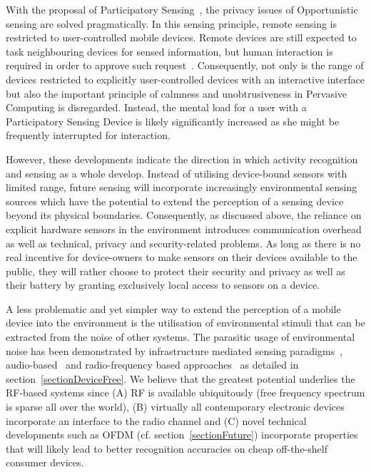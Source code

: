 \documentclass[journal]{IEEEtran}
\begin{document}
With the proposal of Participatory Sensing~\cite{ParticipatorySensing_Burke_2006}, the privacy issues of Opportunistic sensing are solved pragmatically.
In this sensing principle, remote sensing is restricted to user-controlled mobile devices.
Remote devices are still expected to task neighbouring devices for sensed information, but human interaction is required in order to approve such request~\cite{OpportunisticSensing_Lane_2008}.
Consequently, not only is the range of devices restricted to explicitly user-controlled devices with an interactive interface but also the important principle of calmness and unobtrusiveness in Pervasive Computing is disregarded.
Instead, the mental load for a user with a Participatory Sensing Device is likely significantly increased as she might be frequently interrupted for interaction.

However, these developments indicate the direction in which activity recognition and sensing as a whole develop.
Instead of utilising device-bound sensors with limited range, future sensing will incorporate increasingly environmental sensing sources which have the potential to extend the perception of a sensing device beyond its physical boundaries.
Consequently, as discussed above, the reliance on explicit hardware sensors in the environment introduces communication overhead as well as technical, privacy and security-related problems.
As long as there is no real incentive for device-owners to make sensors on their devices available to the public, they will rather choose to protect their security and privacy as well as their battery by granting exclusively local access to sensors on a device.

A less problematic and yet simpler way to extend the perception of a mobile device into the environment is the utilisation of environmental stimuli that can be extracted from the noise of other systems.
The parasitic usage of environmental noise has been demonstrated by infrastructure mediated sensing paradigms~\cite{Pervasive_patel_2008,Pervasive_patel_2008b}, audio-based~\cite{ContextAwareness_Kunze_2007} and radio-frequency based approaches~\cite{RFSensing_Sigg_2014,RFsensing_Pu_2013} as detailed in section~\ref{sectionDeviceFree}.
We believe that the greatest potential underlies the RF-based systems since (A) RF is available ubiquitously (free frequency spectrum is sparse all over the world), (B) virtually all contemporary electronic devices incorporate an interface to the radio channel and (C) novel technical developments such as OFDM (cf. section~\ref{sectionFuture}) incorporate properties that will likely lead to better recognition accuracies on cheap off-the-shelf consumer devices.
\end{document}

